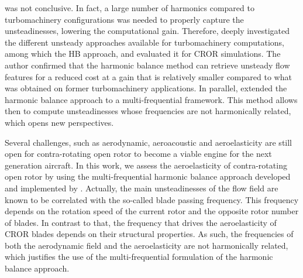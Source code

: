 was not conclusive. In fact, a large number of 
harmonics compared to turbomachinery configurations
was needed to properly capture the unsteadinesses, lowering
the computational gain.
Therefore, \citet{ThesisFrancois} deeply
investigated the different unsteady approaches available 
for turbomachinery computations, among which the HB approach, 
and evaluated it for CROR simulations. 
The author confirmed that
the harmonic balance method can retrieve unsteady
flow features for a reduced cost at a gain that
is relatively smaller compared to what was
obtained on former turbomachinery applications.
In parallel, \citet{ThesisGuedeney} extended the harmonic
balance approach to a multi-frequential framework. 
This method allows then to compute unsteadinesses whose frequencies
are not harmonically related, which opens new perspectives.
\newline

Several challenges, such as aerodynamic,
aeroacoustic and aeroelasticity are still open 
for contra-rotating open rotor
to become a viable engine for the next generation aircraft.
In this work, we assess the aeroelasticity of 
contra-rotating open rotor by using the multi-frequential
harmonic balance approach developed and implemented 
by \citet{ThesisGuedeney}.
Actually, the main unsteadinesses of the flow field
are known to be correlated with the so-called
blade passing frequency. This frequency depends on the
rotation speed of the current rotor and the opposite rotor
number of blades. In contrast to that, the 
frequency that drives the aeroelasticity of CROR
blades depends on their structural properties.
As such, the frequencies of both the aerodynamic
field and the aeroelasticity are not harmonically
related, which justifies the use of the multi-frequential
formulation of the harmonic balance approach.


